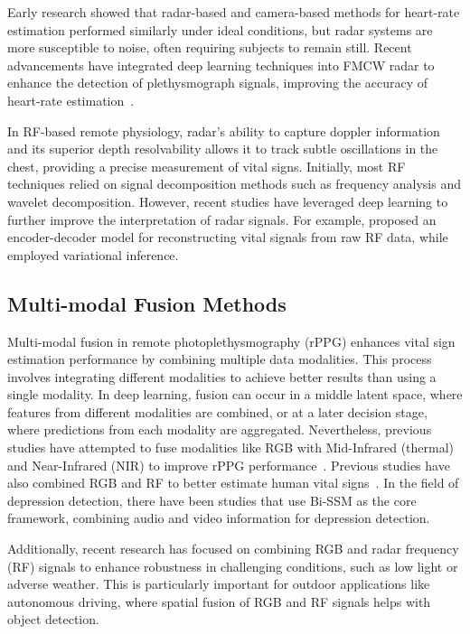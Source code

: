 Early research showed that radar-based and camera-based methods for heart-rate estimation performed similarly under ideal conditions, but radar systems are more susceptible to noise, often requiring subjects to remain still. Recent advancements have integrated deep learning techniques into FMCW radar to enhance the detection of plethysmograph signals, improving the accuracy of heart-rate estimation~\cite{ha2020contactless}.




In RF-based remote physiology, radar’s ability to capture doppler information and its superior depth resolvability allows it to track subtle oscillations in the chest, providing a precise measurement of vital signs. Initially, most RF techniques relied on signal decomposition methods such as frequency analysis and wavelet decomposition. However, recent studies have leveraged deep learning to further improve the interpretation of radar signals. For example, \cite{ha2020contactless} proposed an encoder-decoder model for reconstructing vital signals from raw RF data, while \cite{zheng2021morefi} employed variational inference.

\vspace{-0.8em}
\subsection{Multi-modal Fusion Methods}
Multi-modal fusion in remote photoplethysmography (rPPG) enhances vital sign estimation performance by combining multiple data modalities. This process involves integrating different modalities to achieve better results than using a single modality. In deep learning, fusion can occur in a middle latent space, where features from different modalities are combined, or at a later decision stage, where predictions from each modality are aggregated. Nevertheless, previous studies have attempted to fuse modalities like RGB with Mid-Infrared (thermal) and Near-Infrared (NIR) to improve rPPG performance~\cite{negishi2020contactless, matsumura2020rgb,park2022self}. Previous studies have also combined RGB and RF to better estimate human vital signs~\cite{vilesov2022blending}. In the field of depression detection, there have been studies that use Bi-SSM as the core framework, combining audio and video information for depression detection.

Additionally, recent research has focused on combining RGB and radar frequency (RF) signals to enhance robustness in challenging conditions, such as low light or adverse weather. This is particularly important for outdoor applications like autonomous driving, where spatial fusion of RGB and RF signals helps with object detection.

